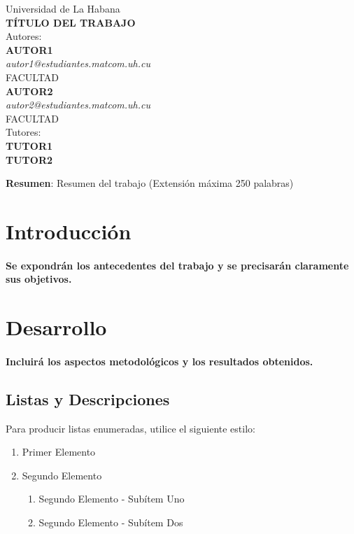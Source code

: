 \documentclass[12pt]{amsart}
\begin{document}
\begin{center}
    {\large Universidad de La Habana}  \\ 
    \vskip 0.1cm
    {\LARGE \textbf{T\'ITULO DEL TRABAJO}} \\
    \vskip 2cm
    {\Large Autores:}\\ 
    \vspace{0.5cm} 
    		{\Large\textbf{AUTOR1}} \\
    		{\normalsize\textit{autor1@estudiantes.matcom.uh.cu}}\\
			FACULTAD\\
			\smallskip
 			{\Large\textbf{AUTOR2}}\\
 			{\normalsize\textit{autor2@estudiantes.matcom.uh.cu}}\\
 			FACULTAD \\
 \smallskip
 \smallskip
    {\Large Tutores:\\ 
    \vspace{0.05cm} 
    		\textbf{TUTOR1\\ TUTOR2}} \\    
  \vskip 1.5cm
  
  \Large \textbf{Resumen}:
    Resumen del trabajo (Extensi\'on m\'axima 250 palabras)
  \end{center}
  


\newpage
\section{Introducci\'on}

\paragraph{Se expondr\'an los antecedentes del trabajo y se precisar\'an claramente sus objetivos.}

\section{Desarrollo}

\paragraph{Incluir\'a los aspectos metodol\'ogicos y los resultados obtenidos.}

	\subsection{Listas y Descripciones}\label{sub:lists}
		Para producir listas enumeradas, utilice el siguiente estilo:
		\begin{enumerate}
			\item Primer Elemento
			\item Segundo Elemento
			\begin {enumerate}
				\item {Segundo Elemento - Subítem Uno}
				\item {Segundo Elemento - Subítem Dos}
			\end {enumerate}
		\end{enumerate}
\end{document}
